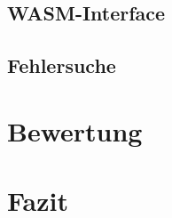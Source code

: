 \subsection{\ac{WASM}-Interface}



\subsection{Fehlersuche}



\section{Bewertung}


\section{Fazit}

